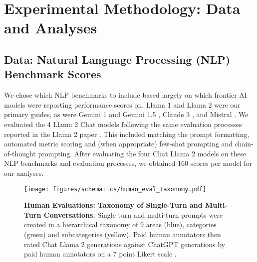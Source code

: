 \section{Experimental Methodology: Data and Analyses}
\label{app:sec:experimental_methodology}

\subsection{Data: Natural Language Processing (NLP) Benchmark Scores}
\label{app:sec:experimental_methodology:nlp_benchmarks}

We chose which NLP benchmarks to include based largely on which frontier AI models were reporting performance scores on. Llama 1 \citep{touvron2023llama1} and Llama 2 \citep{touvron2023llama2} were our primary guides, as were Gemini 1 and Gemini 1.5 \citep{team2023gemini, reid2024gemini}, Claude 3 \citep{anthropic2023claude3}, and Mistral \citep{jiang2023mistral}.
We evaluated the 4 Llama 2 Chat models following the same evaluation processes reported in the Llama 2 paper \citep{touvron2023llama2}.
This included matching the prompt formatting, automated metric scoring and (when appropriate) few-shot prompting and chain-of-thought prompting.
After evaluating the four Chat Llama 2 models on these NLP benchmarks and evaluation processes, we obtained 160 scores per model for our analyses.

\begin{figure*}[t!]
    \centering
    \texttt{[image: figures/schematics/human\_eval\_taxonomy.pdf]}
    \caption{\textbf{Human Evaluations: Taxonomy of Single-Turn and Multi-Turn Conversations.} Single-turn and multi-turn prompts were created in a hierarchical taxonomy of 9 areas (blue), categories (green) and subcategories (yellow). Paid human annotators then rated Chat Llama 2 generations against ChatGPT generations by paid human annotators on a 7 point Likert scale \citep{likert1932technique}.}
    \label{fig:human_eval_prompt_taxonomy}
\end{figure*}


